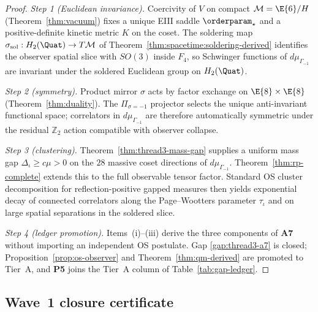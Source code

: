 \begin{proof}
\emph{Step 1 (Euclidean invariance).}
Coercivity of $V$ on compact $\mathcal{M}=\E{6}/H$ (Theorem~\ref{thm:vacuum})
fixes a unique EIII saddle $\orderparam_\star$ and a positive-definite kinetic
metric $K$ on the coset. The soldering map
$\sigma_{\mathrm{sol}}:H_2(\Quat)\to T\mathcal{M}$ of
Theorem~\ref{thm:spacetime:soldering-derived} identifies the observer spatial
slice with $SO(3)$ inside $F_4$, so Schwinger functions of $d\mu_{\Gamma_{-1}}$
are invariant under the soldered Euclidean group on $H_2(\Quat)$.

\emph{Step 2 (symmetry).}
Product mirror $\sigma$ acts by factor exchange on $\E{8}\times\E{8}$
(Theorem~\ref{thm:duality}). The $\Pi_{\sigma=-1}$ projector selects the
unique anti-invariant functional space; correlators in $d\mu_{\Gamma_{-1}}$ are
therefore automatically symmetric under the residual $\mathbb{Z}_2$ action
compatible with observer collapse.

\emph{Step 3 (clustering).}
Theorem~\ref{thm:thread3-mass-gap} supplies a uniform mass gap
$\Delta_\iota\ge c\mu>0$ on the $28$ massive coset directions of
$d\mu_{\Gamma_{-1}}$. Theorem~\ref{thm:rp-complete} extends this to the full
observable tensor factor. Standard OS cluster decomposition for
reflection-positive gapped measures then yields exponential decay of
connected correlators along the Page--Wootters parameter $\tau_\iota$ and on
large spatial separations in the soldered slice.

\emph{Step 4 (ledger promotion).}
Items~(i)--(iii) derive the three components of \textbf{A7} without importing
an independent OS postulate. Gap \ref{gap:thread3-a7} is closed;
Proposition~\ref{prop:os-observer} and Theorem~\ref{thm:qm-derived} are
promoted to Tier~A, and \textbf{P5} joins the Tier~A column of
Table~\ref{tab:gap-ledger}.
\end{proof}

\subsection{Wave~1 closure certificate}

